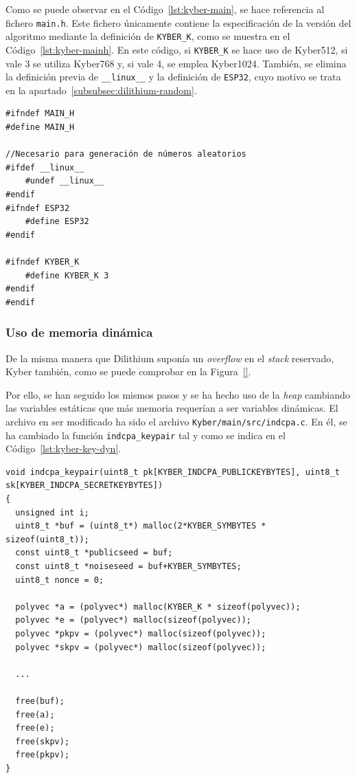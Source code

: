 Como se puede observar en el Código~\ref{lst:kyber-main}, se hace referencia al fichero \texttt{main.h}.
Este fichero únicamente contiene la especificación de la versión del algoritmo mediante la definición de \texttt{KYBER\_K}, como se muestra en el Código~\ref{lst:kyber-mainh}.
En este código, si \texttt{KYBER\_K} se hace uso de Kyber512, si vale 3 se utiliza Kyber768 y, si vale 4, se emplea Kyber1024.
También, se elimina la definición previa de \texttt{\_\_linux\_\_} y la definición de \texttt{ESP32}, cuyo motivo se trata en la apartado~\ref{subsubsec:dilithium-random}.

\begin{lstlisting}[label={lst:kyber-mainh},style=Cnice,firstnumber=1,caption={Archivo \texttt{Kyber/main/include/main.h}.}]
#ifndef MAIN_H
#define MAIN_H

//Necesario para generación de números aleatorios
#ifdef __linux__
    #undef __linux__
#endif
#ifndef ESP32
    #define ESP32
#endif

#ifndef KYBER_K
    #define KYBER_K 3
#endif
#endif
\end{lstlisting}


\subsubsection{Uso de memoria dinámica}\label{subsubsec:kyber-dynamic}

De la misma manera que Dilithium suponía un \textit{overflow} en el \textit{stack} reservado, Kyber también, como se puede comprobar en la Figura~\ref{}.


Por ello, se han seguido los mismos pasos y se ha hecho uso de la \textit{heap} cambiando las variables estáticas que más memoria requerían a ser variables dinámicas.
El archivo en ser modificado ha sido el archivo \texttt{Kyber/main/src/indcpa.c}.
En él, se ha cambiado la función \texttt{indcpa\_keypair} tal y como se indica en el Código~\ref{lst:kyber-key-dyn}.

\begin{lstlisting}[label={lst:kyber-key-dyn},style=Cnice,firstnumber=1,caption={Modificación de la función \texttt{indcpa\_keypair} en el archivo \texttt{Kyber/main/src/indcpa.c}.}]
void indcpa_keypair(uint8_t pk[KYBER_INDCPA_PUBLICKEYBYTES], uint8_t sk[KYBER_INDCPA_SECRETKEYBYTES])
{
  unsigned int i;
  uint8_t *buf = (uint8_t*) malloc(2*KYBER_SYMBYTES * sizeof(uint8_t));
  const uint8_t *publicseed = buf;
  const uint8_t *noiseseed = buf+KYBER_SYMBYTES;
  uint8_t nonce = 0;

  polyvec *a = (polyvec*) malloc(KYBER_K * sizeof(polyvec));
  polyvec *e = (polyvec*) malloc(sizeof(polyvec));
  polyvec *pkpv = (polyvec*) malloc(sizeof(polyvec));
  polyvec *skpv = (polyvec*) malloc(sizeof(polyvec));

  ...

  free(buf);
  free(a);
  free(e);
  free(skpv);
  free(pkpv);
}
\end{lstlisting}

